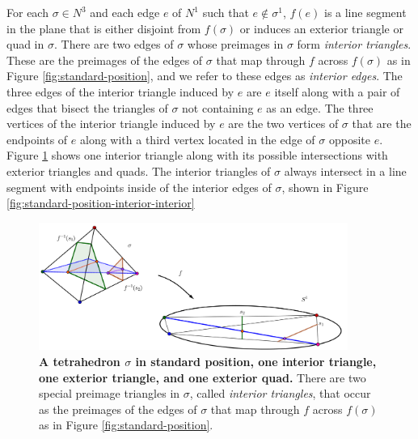 For each $\sigma\in N^3$ and each edge $e$ of $N^1$ such that $e\notin\sigma^1$, $f(e)$ is a line segment in the plane that is either disjoint from $f(\sigma)$ or induces an exterior triangle or quad in $\sigma$.
There are two edges of $\sigma$ whose preimages in $\sigma$ form \emph{interior triangles}.
These are the preimages of the edges of $\sigma$ that map through $f$ across $f(\sigma)$ as in Figure \ref{fig:standard-position}, and we refer to these edges as \emph{interior edges}.
The three edges of the interior triangle induced by $e$ are $e$ itself along with a pair of edges that bisect the triangles of $\sigma$ not containing $e$ as an edge.
The three vertices of the interior triangle induced by $e$ are the two vertices of $\sigma$ that are the endpoints of $e$ along with a third vertex located in the edge of $\sigma$ opposite $e$.
Figure \ref{fig:standard-position-interior-exterior} shows one interior triangle along with its possible intersections with exterior triangles and quads.
The interior triangles of $\sigma$ always intersect in a line segment with endpoints inside of the interior edges of $\sigma$, shown in Figure \ref{fig:standard-position-interior-interior}

\begin{figure}[h!]
	\centering
	\includegraphics[width=0.9\textwidth]{figures/standard-position-interior-exterior.png}
	\caption{
		\textbf{A tetrahedron $\sigma$ in standard position, one interior triangle, one exterior triangle, and one exterior quad.}
		There are two special preimage triangles in $\sigma$, called \emph{interior triangles}, that occur as the preimages of the edges of $\sigma$ that map through $f$ across $f(\sigma)$ as in Figure \ref{fig:standard-position}.
	}
	\label{fig:standard-position-interior-exterior}
\end{figure}

